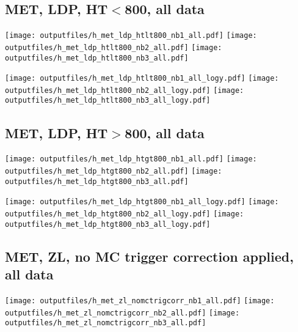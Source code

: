 \documentclass[11pt]{article}
\begin{document}
    \subsection{ MET, LDP, HT$<$800, all data}

    \noindent
     \texttt{[image: outputfiles/h\_met\_ldp\_htlt800\_nb1\_all.pdf]}
     \texttt{[image: outputfiles/h\_met\_ldp\_htlt800\_nb2\_all.pdf]}
     \texttt{[image: outputfiles/h\_met\_ldp\_htlt800\_nb3\_all.pdf]}

    \noindent
     \texttt{[image: outputfiles/h\_met\_ldp\_htlt800\_nb1\_all\_logy.pdf]}
     \texttt{[image: outputfiles/h\_met\_ldp\_htlt800\_nb2\_all\_logy.pdf]}
     \texttt{[image: outputfiles/h\_met\_ldp\_htlt800\_nb3\_all\_logy.pdf]}


    \subsection{ MET, LDP, HT$>$800, all data}

    \noindent
     \texttt{[image: outputfiles/h\_met\_ldp\_htgt800\_nb1\_all.pdf]}
     \texttt{[image: outputfiles/h\_met\_ldp\_htgt800\_nb2\_all.pdf]}
     \texttt{[image: outputfiles/h\_met\_ldp\_htgt800\_nb3\_all.pdf]}

    \noindent
     \texttt{[image: outputfiles/h\_met\_ldp\_htgt800\_nb1\_all\_logy.pdf]}
     \texttt{[image: outputfiles/h\_met\_ldp\_htgt800\_nb2\_all\_logy.pdf]}
     \texttt{[image: outputfiles/h\_met\_ldp\_htgt800\_nb3\_all\_logy.pdf]}



     \subsection{ MET, ZL, no MC trigger correction applied, all data}

    \noindent
     \texttt{[image: outputfiles/h\_met\_zl\_nomctrigcorr\_nb1\_all.pdf]}
     \texttt{[image: outputfiles/h\_met\_zl\_nomctrigcorr\_nb2\_all.pdf]}
     \texttt{[image: outputfiles/h\_met\_zl\_nomctrigcorr\_nb3\_all.pdf]}
\end{document}
